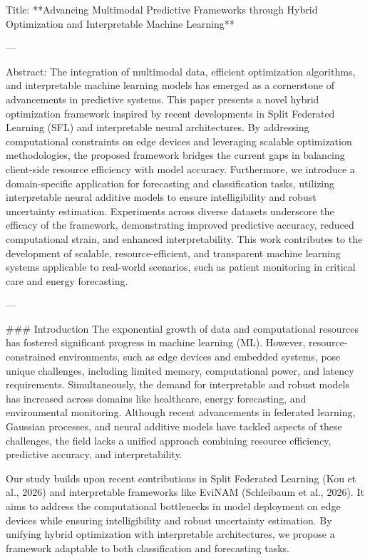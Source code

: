 Title: **Advancing Multimodal Predictive Frameworks through Hybrid Optimization and Interpretable Machine Learning**

---

Abstract:  
The integration of multimodal data, efficient optimization algorithms, and interpretable machine learning models has emerged as a cornerstone of advancements in predictive systems. This paper presents a novel hybrid optimization framework inspired by recent developments in Split Federated Learning (SFL) and interpretable neural architectures. By addressing computational constraints on edge devices and leveraging scalable optimization methodologies, the proposed framework bridges the current gaps in balancing client-side resource efficiency with model accuracy. Furthermore, we introduce a domain-specific application for forecasting and classification tasks, utilizing interpretable neural additive models to ensure intelligibility and robust uncertainty estimation. Experiments across diverse datasets underscore the efficacy of the framework, demonstrating improved predictive accuracy, reduced computational strain, and enhanced interpretability. This work contributes to the development of scalable, resource-efficient, and transparent machine learning systems applicable to real-world scenarios, such as patient monitoring in critical care and energy forecasting.

---

### Introduction  
The exponential growth of data and computational resources has fostered significant progress in machine learning (ML). However, resource-constrained environments, such as edge devices and embedded systems, pose unique challenges, including limited memory, computational power, and latency requirements. Simultaneously, the demand for interpretable and robust models has increased across domains like healthcare, energy forecasting, and environmental monitoring. Although recent advancements in federated learning, Gaussian processes, and neural additive models have tackled aspects of these challenges, the field lacks a unified approach combining resource efficiency, predictive accuracy, and interpretability.

Our study builds upon recent contributions in Split Federated Learning (Kou et al., 2026) and interpretable frameworks like EviNAM (Schleibaum et al., 2026). It aims to address the computational bottlenecks in model deployment on edge devices while ensuring intelligibility and robust uncertainty estimation. By unifying hybrid optimization with interpretable architectures, we propose a framework adaptable to both classification and forecasting tasks.

